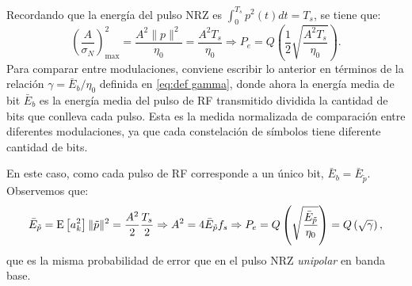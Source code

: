 \begin{ejemplo}
    Recordando que la energía del pulso NRZ es $\int_0^{T_s} p^2(t)dt = T_s$, se tiene que:
    \begin{equation*}
        \left(\frac{A}{\sigma_N}\right)_{\max}^2 = \frac{A^2\|p\|^2}{\eta_0} = \frac{A^2 T_s}{\eta_0} \Rightarrow P_e = Q\left(\frac{1}{2}\sqrt{\frac{A^2 T_s}{\eta_0}}\right).
    \end{equation*}
    Para comparar entre modulaciones, conviene escribir lo anterior en términos de la relación $\gamma = \bar{E}_b/\eta_0$ definida en \eqref{eq:def gamma}, donde ahora la energía media de bit $\bar{E}_b$ es la energía media del pulso de RF transmitido dividida la cantidad de bits que conlleva cada pulso.
    Esta es la medida normalizada de comparación entre diferentes modulaciones, ya que cada constelación de símbolos tiene diferente cantidad de bits.

    En este caso, como cada pulso de RF corresponde a un único bit, $\bar{E}_b = \bar{E}_{\tilde{p}}$. Observemos que:
    \begin{equation*}
        \bar{E}_{\tilde{p}} = \mathrm{E}\left[a_k^2\right] \|\tilde{p}\|^2 = \frac{A^2}{2} \frac{T_s}{2} \Rightarrow A^2 = 4\bar{E}_{\tilde{p}} f_s \Rightarrow P_e = Q\left(\sqrt{\frac{\bar{E}_{\tilde{p}}}{\eta_0}}\right) = Q\left(\sqrt{\gamma}\right),
    \end{equation*}
    que es la misma probabilidad de error que en el pulso NRZ \emph{unipolar} en banda base.
\end{ejemplo}

